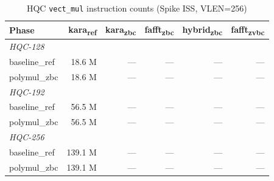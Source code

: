 \begin{table}[h]
  \centering
  \caption{HQC \texttt{vect_mul} instruction counts (Spike ISS, VLEN=256)}
  \label{tab:vect_mul_counts}
  \begin{tabular}{lrrrrr}
    \toprule
    Phase & kara\textsubscript{ref} & kara\textsubscript{zbc} & fafft\textsubscript{zbc} & hybrid\textsubscript{zbc} & fafft\textsubscript{zvbc} \\
    \midrule
    \multicolumn{6}{l}{\textit{HQC-128}} \\
    baseline_ref & 18.6 M & — & — & — & — \\
    polymul_zbc & 18.6 M & — & — & — & — \\
    \multicolumn{6}{l}{\textit{HQC-192}} \\
    baseline_ref & 56.5 M & — & — & — & — \\
    polymul_zbc & 56.5 M & — & — & — & — \\
    \multicolumn{6}{l}{\textit{HQC-256}} \\
    baseline_ref & 139.1 M & — & — & — & — \\
    polymul_zbc & 139.1 M & — & — & — & — \\
    \bottomrule
  \end{tabular}
\end{table}
